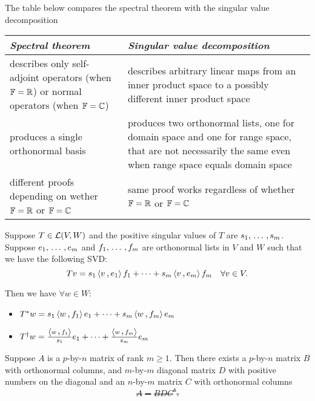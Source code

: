 The table below compares the spectral theorem with the singular value decomposition

\begin{tabular}{|p{}|p{}|}
  \hline
  \emph{Spectral theorem} & \emph{Singular value decomposition} \\
  \hline
  describes only self-adjoint operators (when $\mathbb{F} = \mathbb{R}$) or normal operators (when $\mathbb{F} = \mathbb{C}$) & describes arbitrary linear maps from an inner product space to a possibly different inner product space \\
  \hline
  produces a single orthonormal basis &
  produces two orthonormal lists, one for domain space and one for range space, that are not necessarily the same even when range space equals domain space \\
  \hline
  different proofs depending on wether $\mathbb{F} = \mathbb{R}$ or $\mathbb{F} = \mathbb{C}$ & same proof works regardless of whether $\mathbb{F} = \mathbb{R}$ or $\mathbb{F} = \mathbb{C}$ \\
  \hline
\end{tabular}

\begin{thm}
  \label{thm: singular value decomposition of adjoint and pseudoinverse}
  Suppose $T \in \mathcal{L}(V,W)$ and the positive singular values of $T$ are $s_1, {\, \ldots \,\,}, s_m$. Suppose $e_1, {\, \ldots \,\,}, e_m$ and $f_1, {\, \ldots \,\,}, f_m$ are orthonormal lists in $V$ and $W$ such that we have the following SVD:
  \[
    Tv = s_1 \ip{v}{e_1} f_1 + \cdots + s_m \ip{v}{e_m}f_m \quad \forall v \in V.
  \]

  Then we have $\forall w \in W$:
  \begin{itemize}
    \item $T^*w = s_1 \ip{w}{f_1}e_1 + \cdots + s_m \ip{w}{f_m}e_m$
    \item $T^\dagger w = \tfrac{\ip{w}{f_1}}{s_1} e_1 + \cdots + \tfrac{\ip{w}{f_m}}{s_m} e_m$
  \end{itemize}
\end{thm}

\begin{thm}
  Suppose $A$ is a $p$-by-$n$ matrix of rank $m \geq 1$. Then there exists a $p$-by-$n$ matrix $B$ with orthonormal columns, and $m$-by-$m$ diagonal matrix $D$ with positive numbers on the diagonal and an $n$-by-$m$ matrix $C$ with orthonormal columns \st
  \[
    A = BDC^*.
  \]
\end{thm}
